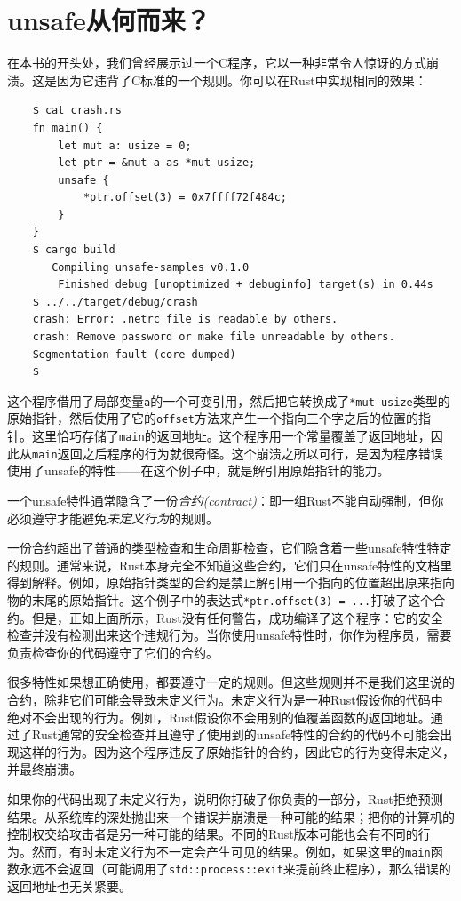 \section{unsafe从何而来？}
在本书的开头处，我们曾经展示过一个C程序，它以一种非常令人惊讶的方式崩溃。这是因为它违背了C标准的一个规则。你可以在Rust中实现相同的效果：

\begin{verbatim}
    $ cat crash.rs
    fn main() {
        let mut a: usize = 0;
        let ptr = &mut a as *mut usize;
        unsafe {
            *ptr.offset(3) = 0x7ffff72f484c;
        }
    }
    $ cargo build
       Compiling unsafe-samples v0.1.0
        Finished debug [unoptimized + debuginfo] target(s) in 0.44s
    $ ../../target/debug/crash
    crash: Error: .netrc file is readable by others.
    crash: Remove password or make file unreadable by others.
    Segmentation fault (core dumped)
    $
\end{verbatim}

这个程序借用了局部变量\texttt{a}的一个可变引用，然后把它转换成了\texttt{*mut usize}类型的原始指针，然后使用了它的\texttt{offset}方法来产生一个指向三个字之后的位置的指针。这里恰巧存储了\texttt{main}的返回地址。这个程序用一个常量覆盖了返回地址，因此从\texttt{main}返回之后程序的行为就很奇怪。这个崩溃之所以可行，是因为程序错误使用了unsafe的特性——在这个例子中，就是解引用原始指针的能力。

一个unsafe特性通常隐含了一份\emph{合约(contract)}：即一组Rust不能自动强制，但你必须遵守才能避免\emph{未定义行为}的规则。

一份合约超出了普通的类型检查和生命周期检查，它们隐含着一些unsafe特性特定的规则。通常来说，Rust本身完全不知道这些合约，它们只在unsafe特性的文档里得到解释。例如，原始指针类型的合约是禁止解引用一个指向的位置超出原来指向物的末尾的原始指针。这个例子中的表达式\texttt{*ptr.offset(3) = ...}打破了这个合约。但是，正如上面所示，Rust没有任何警告，成功编译了这个程序：它的安全检查并没有检测出来这个违规行为。当你使用unsafe特性时，你作为程序员，需要负责检查你的代码遵守了它们的合约。

很多特性如果想正确使用，都要遵守一定的规则。但这些规则并不是我们这里说的合约，除非它们可能会导致未定义行为。未定义行为是一种Rust假设你的代码中绝对不会出现的行为。例如，Rust假设你不会用别的值覆盖函数的返回地址。通过了Rust通常的安全检查并且遵守了使用到的unsafe特性的合约的代码不可能会出现这样的行为。因为这个程序违反了原始指针的合约，因此它的行为变得未定义，并最终崩溃。

如果你的代码出现了未定义行为，说明你打破了你负责的一部分，Rust拒绝预测结果。从系统库的深处抛出来一个错误并崩溃是一种可能的结果；把你的计算机的控制权交给攻击者是另一种可能的结果。不同的Rust版本可能也会有不同的行为。然而，有时未定义行为不一定会产生可见的结果。例如，如果这里的\texttt{main}函数永远不会返回（可能调用了\texttt{std::process::exit}来提前终止程序），那么错误的返回地址也无关紧要。


